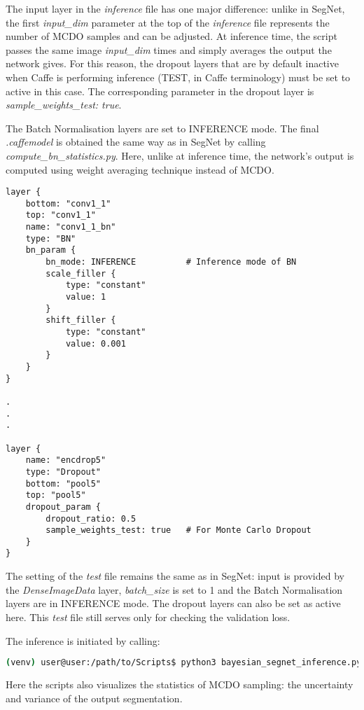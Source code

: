 The input layer in the \textit{inference} file has one major difference: unlike in SegNet, the first \textit{input\_dim} parameter at the top of the \textit{inference} file represents the number of MCDO samples and can be adjusted. At inference time, the script passes the same image \textit{input\_dim} times and simply averages the output the network gives. For this reason, the dropout layers that are by default inactive when Caffe is performing inference (TEST, in Caffe terminology) must be set to active in this case. The corresponding parameter in the dropout layer is \textit{sample\_weights\_test: true}. 

The Batch Normalisation layers are set to INFERENCE mode. The final \textit{.caffemodel} is obtained the same way as in SegNet by calling \textit{compute\_bn\_statistics.py}. Here, unlike at inference time, the network's output is computed using weight averaging technique instead of MCDO.

\begin{lstlisting}
layer {
	bottom: "conv1_1"
	top: "conv1_1"
	name: "conv1_1_bn"
	type: "BN"
	bn_param {
		bn_mode: INFERENCE			# Inference mode of BN
		scale_filler {
			type: "constant"
			value: 1
		}
		shift_filler {
			type: "constant"
			value: 0.001
		}
	}
}

.
.
.

layer {
	name: "encdrop5"
	type: "Dropout"
	bottom: "pool5"
	top: "pool5"
	dropout_param {
		dropout_ratio: 0.5
		sample_weights_test: true	# For Monte Carlo Dropout
	}
}
\end{lstlisting}

The setting of the \textit{test} file remains the same as in SegNet: input is provided by the \textit{DenseImageData} layer, \textit{batch\_size} is set to 1 and the Batch Normalisation layers are in INFERENCE mode. The dropout layers can also be set as active here. This \textit{test} file still serves only for checking the validation loss.

The inference is initiated by calling:

\begin{lstlisting}[language=bash]
(venv) user@user:/path/to/Scripts$ python3 bayesian_segnet_inference.py /path/to/inference.prototxt /path/to/final_weights.caffemodel /path/to/videofile.avi 
\end{lstlisting}

Here the scripts also visualizes the statistics of MCDO sampling: the uncertainty and variance of the output segmentation.

